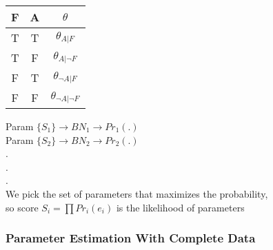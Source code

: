 \documentclass[../../lecture_notes.tex]{subfiles}
\begin{document}
\begin{minipage}{0.3\linewidth}
\begin{tabular} { | c | c c | } \hline
	F & A & $\theta$\\\hline
	T & T & $\theta_{A|F}$\\
	T & F & $\theta_{A|\neg F}$\\
	F & T & $\theta_{\neg A|F}$\\ 
	F & F & $\theta_{\neg A|\neg F}$\\\hline
\end{tabular}\end{minipage}%
\begin{minipage}{0.7\linewidth}
Param $\{S_1\} \rightarrow BN_1 \rightarrow Pr_1(.)$\\
Param $\{S_2\} \rightarrow BN_2 \rightarrow Pr_2(.)$\\
\indent .\\
\indent .\\
\indent .\\
We pick the set of parameters that maximizes the probability,\\
	\indent so score $S_i = \prod Pr_i (e_i)$ is the likelihood of parameters\\
\end{minipage}

\subsubsection*{Parameter Estimation With Complete Data}
\end{document}
